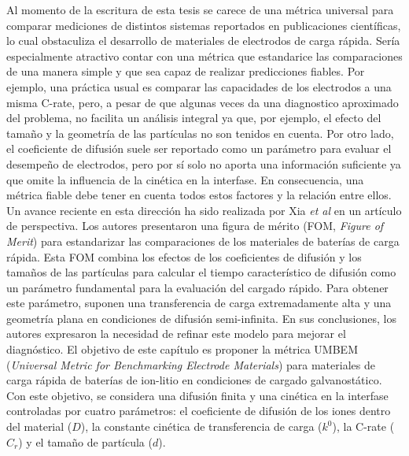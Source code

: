Al momento de la escritura de esta tesis se carece de una métrica universal 
para comparar mediciones de distintos sistemas reportados en publicaciones
científicas, lo cual obstaculiza el desarrollo de materiales de electrodos de
carga rápida. Sería especialmente atractivo contar con una métrica que 
estandarice las comparaciones de una manera simple y que sea capaz de realizar
predicciones fiables. Por ejemplo, una práctica usual es comparar las 
capacidades de los electrodos a una misma C-rate, pero, a pesar de que algunas
veces da una diagnostico aproximado del problema, no facilita un análisis 
integral ya que, por ejemplo, el efecto del tamaño y la geometría de las 
partículas no son tenidos en cuenta. Por otro lado, el coeficiente de difusión
suele ser reportado como un parámetro para evaluar el desempeño de electrodos,
pero por sí solo no aporta una información suficiente ya que omite la 
influencia de la cinética en la interfase. En consecuencia, una métrica fiable 
debe tener en cuenta todos estos factores y la relación entre ellos. Un avance
reciente en esta dirección ha sido realizada por Xia \textit{et al} 
\cite{xia2022} en un artículo de perspectiva. Los autores presentaron una 
figura de mérito (FOM, \textit{Figure of Merit}) para estandarizar las 
comparaciones de los materiales de baterías de carga rápida. Esta FOM combina
los efectos de los coeficientes de difusión y los tamaños de las partículas 
para calcular el tiempo característico de difusión como un parámetro 
fundamental para la evaluación del cargado rápido. Para obtener este parámetro,
suponen una transferencia de carga extremadamente alta y una geometría plana 
en condiciones de difusión semi-infinita. En sus conclusiones, los autores 
expresaron la necesidad de refinar este modelo para mejorar el diagnóstico. 
El objetivo de este capítulo es proponer la métrica UMBEM (\textit{Universal
Metric for Benchmarking Electrode Materials}) para materiales de carga rápida
de baterías de ion-litio en condiciones de cargado galvanostático. Con este
objetivo, se considera una difusión finita y una cinética en la interfase 
controladas por cuatro parámetros: el coeficiente de difusión de los iones 
dentro del material ($D$), la constante cinética de transferencia de carga
($k^0$), la C-rate ($C_r$) y el tamaño de partícula ($d$).

